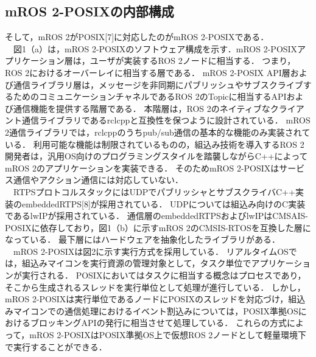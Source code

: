 \subsection{mROS 2-POSIXの内部構成}
そして，mROS 2がPOSIX[7]に対応したのがmROS 2-POSIXである．
\\　図1（a）は，mROS 2-POSIXのソフトウェア構成を示す．mROS 2-POSIXアプリケーション層は，ユーザが実装するROS 2ノードに相当する．
つまり，ROS 2におけるオーバーレイに相当する層である．
mROS 2-POSIX API層および通信ライブラリ層は，メッセージを非同期にパブリッシュやサブスクライブするためのコミュニケーションチャネルであるROS 2のTopicに相当するAPIおよび通信機能を提供する階層である．
本階層は，ROS 2のネイティブなクライアント通信ライブラリであるrclcppと互換性を保つように設計されている．
mROS 2通信ライブラリでは，rclcppのうちpub/sub通信の基本的な機能のみ実装されている．
利用可能な機能は制限されているものの，組込み技術を導入するROS 2開発者は，汎用OS向けのプログラミングスタイルを踏襲しながらC++によってmROS 2のアプリケーションを実装できる．
そのためmROS 2-POSIXはサービス通信やアクション通信には対応していない．
\\　RTPSプロトコルスタックにはUDPでパブリッシャとサブスクライバC++実装のembeddedRTPS[8]が採用されている．
UDPについては組込み向けのC実装であるlwIPが採用されている．
通信層のembeddedRTPSおよびlwIPはCMSAIS-POSIXに依存しており，図1（b）に示すmROS 2のCMSIS-RTOSを互換した層になっている．
最下層にはハードウェアを抽象化したライブラリがある．
\\　mROS 2-POSIXは図2に示す実行方式を採用している．
リアルタイムOSでは，組込みマイコンを実行資源の管理対象として，タスク単位でアプリケーションが実行される．
POSIXにおいてはタスクに相当する概念はプロセスであり，そこから生成されるスレッドを実行単位として処理が進行している．
しかし，mROS 2-POSIXは実行単位であるノードにPOSIXのスレッドを対応づけ，組込みマイコンでの通信処理におけるイベント割込みについては，POSIX準拠OSにおけるブロッキングAPIの発行に相当させて処理している．
これらの方式によって，mROS 2-POSIXはPOSIX準拠OS上で仮想ROS 2ノードとして軽量環境下で実行することができる．
